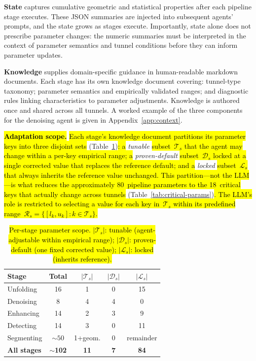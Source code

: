 \documentclass[a4paper,fleqn]{cas-dc}
\begin{document}
{\textbf{State} captures cumulative geometric and statistical properties after each pipeline stage executes. These JSON summaries are injected into subsequent agents' prompts, and the state grows as stages execute. Importantly, state alone does not prescribe parameter changes: the numeric summaries must be interpreted in the context of parameter semantics and tunnel conditions before they can inform parameter updates.

\textbf{Knowledge} supplies domain-specific guidance in human-readable markdown documents. Each stage has its own knowledge document covering: tunnel-type taxonomy; parameter semantics and empirically validated ranges; and diagnostic rules linking characteristics to parameter adjustments. Knowledge is authored once and shared across all tunnels. A worked example of the three components for the denoising agent is given in Appendix~\ref{app:context}.

\hl{\textbf{Adaptation scope.}} \hl{Each stage's knowledge document partitions its parameter keys into three disjoint sets} (Table~\ref{tab:param-scope})\hl{: a} \emph{tunable} \hl{subset~$\mathcal{T}_s$ that the agent may change within a per-key empirical range; a} \emph{proven-default} \hl{subset~$\mathcal{D}_s$ locked at a single corrected value that replaces the reference default; and a} \emph{locked} \hl{subset~$\mathcal{L}_s$ that always inherits the reference value unchanged. This partition---not the LLM---is what reduces the approximately 80~pipeline parameters to the 18~critical keys that actually change across tunnels} (Table~\ref{tab:critical-params})\hl{. The LLM's role is restricted to selecting a value for each key in~$\mathcal{T}_s$ within its predefined range~$\mathcal{R}_s = \{[l_k, u_k] : k \in \mathcal{T}_s\}$.}

\begin{table}[ht]
\caption{\hl{Per-stage parameter scope. $|\mathcal{T}_s|$: tunable (agent-adjustable within empirical range); $|\mathcal{D}_s|$: proven-default (one fixed corrected value); $|\mathcal{L}_s|$: locked (inherits reference).}}\label{tab:param-scope}
\begin{tabular*}{\tblwidth}{@{} l c c c c @{}}
\toprule
Stage & Total & $|\mathcal{T}_s|$ & $|\mathcal{D}_s|$ & $|\mathcal{L}_s|$ \\
\midrule
Unfolding & 16 & 1 & 0 & 15 \\
Denoising & 8 & 4 & 4 & 0 \\
Enhancing & 14 & 2 & 3 & 9 \\
Detecting & 14 & 3 & 0 & 11 \\
Segmenting & ${\sim}50$ & 1{+}geom. & 0 & remainder \\
\midrule
\textbf{All stages} & ${\sim}$\textbf{102} & \textbf{11} & \textbf{7} & \textbf{84} \\
\bottomrule
\end{tabular*}
\end{table}

}
\end{document}
